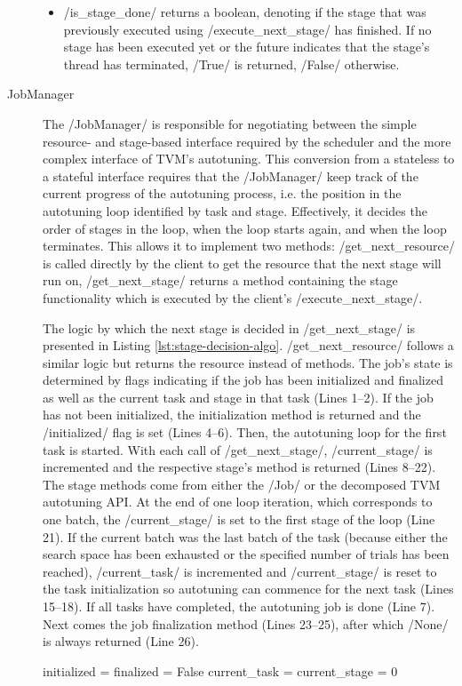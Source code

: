 \begin{description}
\begin{itemize}
		\item \pythoninline/is_stage_done/ returns a boolean, denoting if the stage that was previously executed using \pythoninline/execute_next_stage/ has finished. If no stage has been executed yet or the future indicates that the stage's thread has terminated,  \pythoninline/True/ is returned,  \pythoninline/False/ otherwise.
	\end{itemize}
	\item[JobManager] The \pythoninline/JobManager/ is responsible for negotiating between the simple resource- and stage-based interface required by the scheduler and the more complex interface of TVM's autotuning. This conversion from a stateless to a stateful interface requires that the \pythoninline/JobManager/ keep track of the current progress of the autotuning process, i.e. the position in the autotuning loop identified by task and stage. Effectively, it decides the order of stages in the loop, when the loop starts again, and when the loop terminates. This allows it to implement two methods: \pythoninline/get_next_resource/ is called directly by the client to get the resource that the next stage will run on, \pythoninline/get_next_stage/ returns a method containing the stage functionality which is executed by the client's \pythoninline/execute_next_stage/.\par
	The logic by which the next stage is decided in \pythoninline/get_next_stage/ is presented in Listing \ref{lst:stage-decision-algo}. \pythoninline/get_next_resource/ follows a similar logic but returns the resource instead of methods. The job's state is determined by flags indicating if the job has been initialized and finalized as well as the current task and stage in that task (Lines 1--2). If the job has not been initialized, the initialization method is returned and the \pythoninline/initialized/ flag is set (Lines 4--6). Then, the autotuning loop for the first task is started. With each call of \pythoninline/get_next_stage/, \pythoninline/current_stage/ is incremented and the respective stage's method is returned (Lines 8--22). The stage methods come from either the \pythoninline/Job/ or the decomposed TVM autotuning API. At the end of one loop iteration, which corresponds to one batch, the \pythoninline/current_stage/ is set to the first stage of the loop (Line 21). If the current batch was the last batch of the task (because either the search space has been exhausted or the specified number of trials has been reached), \pythoninline/current_task/ is incremented and \pythoninline/current_stage/ is reset to the task initialization so autotuning can commence for the next task (Lines 15--18). If all tasks have completed, the autotuning job is done (Line 7). Next comes the job finalization method (Lines 23--25), after which \pythoninline/None/ is always returned (Line 26).\par
\begin{listing}[h]
\begin{pythoncode}
initialized = finalized = False
current_task = current_stage = 0


\end{pythoncode}
\end{listing}
\end{description}
